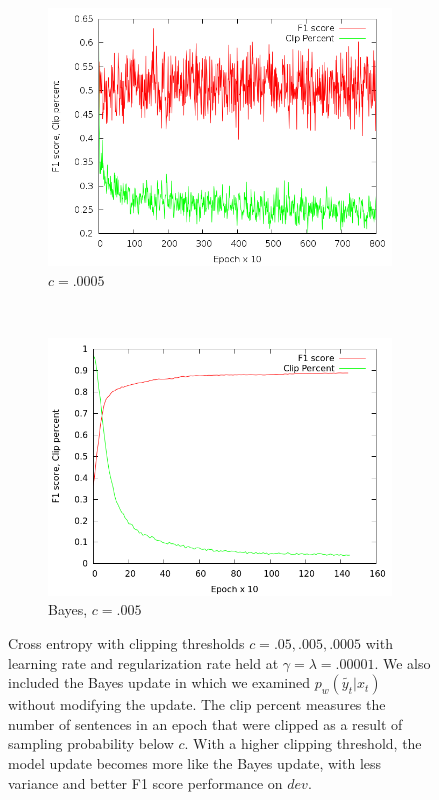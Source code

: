 \documentclass{article}
\begin{document}
\begin{figure}[t!]
  \begin{subfigure}[t]{0.5\textwidth}
        \centering
       \includegraphics[scale=.2]{output0005}
        \caption{$c=.0005$}
    \end{subfigure}%
~
  \begin{subfigure}[t]{0.5\textwidth}
        \centering
       \includegraphics[scale=.2]{bayes}
        \caption{Bayes, $c=.005$}
    \end{subfigure}%
    \caption{Cross entropy with clipping thresholds $c=.05, .005, .0005$ with learning rate and regularization rate held at $\gamma=\lambda=.00001$. We also included the Bayes update in which we examined $p_{w}(\tilde{y_{t}}|x_{t})$ without modifying the update. The clip percent measures the number of sentences in an epoch that were clipped as a result of sampling probability below $c$. With a higher clipping threshold, the model update becomes more like the Bayes update, with less variance and better F1 score performance on $dev$.}
\end{figure}
\end{document}
